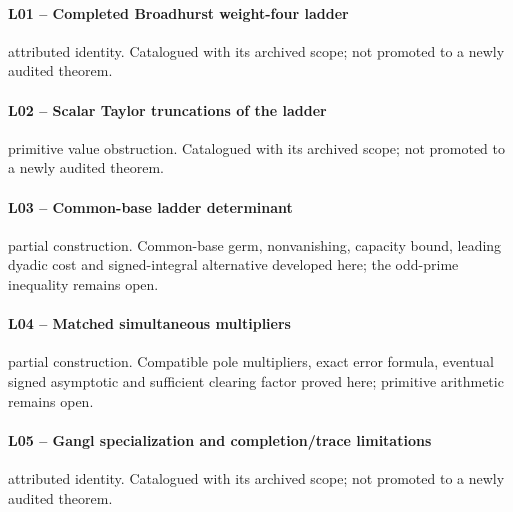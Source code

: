 \paragraph{L01 -- Completed Broadhurst weight-four ladder}\label{record-L01}
attributed identity. Catalogued with its archived scope; not promoted to a newly audited theorem.
\par\smallskip{}\par
\paragraph{L02 -- Scalar Taylor truncations of the ladder}\label{record-L02}
primitive value obstruction. Catalogued with its archived scope; not promoted to a newly audited theorem.
\par\smallskip{}\par
\paragraph{L03 -- Common-base ladder determinant}\label{record-L03}
partial construction. Common-base germ, nonvanishing, capacity bound, leading dyadic cost and signed-integral alternative developed here; the odd-prime inequality remains open.
\par\smallskip{}\par
\paragraph{L04 -- Matched simultaneous multipliers}\label{record-L04}
partial construction. Compatible pole multipliers, exact error formula, eventual signed asymptotic and sufficient clearing factor proved here; primitive arithmetic remains open.
\par\smallskip{}\par
\paragraph{L05 -- Gangl specialization and completion/trace limitations}\label{record-L05}
attributed identity. Catalogued with its archived scope; not promoted to a newly audited theorem.
\par\smallskip{}\par
